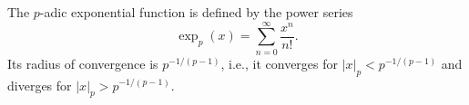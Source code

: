 The $p$-adic exponential function is defined by the power series $$\exp_p(x) = \sum_{n=0}^\infty \frac{x^n}{n!}.$$ Its radius of convergence is $p^{-1/(p-1)}$, i.e., it converges for $|x|_p < p^{-1/(p-1)}$ and diverges for $|x|_p > p^{-1/(p-1)}$.